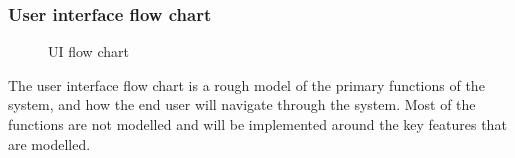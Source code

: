 \subsubsection{User interface flow chart}
\begin{figure}[H]
\caption{UI flow chart}
\end{figure}

The user interface flow chart is a rough model of the primary functions of the system, and how the end user will navigate through the system. Most of the functions are not modelled and will be implemented around the key features that are modelled. 
